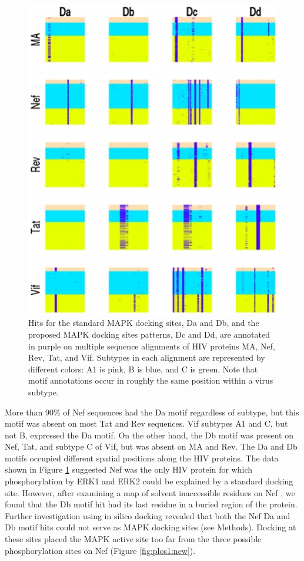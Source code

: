 \begin{figure}
\begin{center}
\includegraphics[scale=0.9]{figs/plos1_1}
\end{center}
\caption[MAPK docking site pattern hits on HIV proteins]{\small Hits
  for the standard MAPK docking sites, Da and Db, and the proposed
  MAPK docking sites patterns, Dc and Dd, are annotated in purple on
  multiple sequence alignments of HIV proteins MA, Nef, Rev, Tat, and
  Vif. Subtypes in each alignment are represented by different colors:
  A1 is pink, B is blue, and C is green. Note that motif annotations
  occur in roughly the same position within a virus
  subtype. \label{fig:plos1:fig1}}
\end{figure}

More than 90\% of Nef sequences had the Da motif regardless of
subtype, but this motif was absent on most Tat and Rev sequences. Vif
subtypes A1 and C, but not B, expressed the Da motif. On the other
hand, the Db motif was present on Nef, Tat, and subtype C of Vif, but
was absent on MA and Rev. The Da and Db motifs occupied different
spatial positions along the HIV proteins. The data shown in Figure
\ref{fig:plos1:fig1} suggested Nef was the only HIV protein for which
phosphorylation by ERK1 and ERK2 could be explained by a standard
docking site. However, after examining a map of solvent inaccessible
residues on Nef \cite{arold2001dynamic}, we found that the Db motif
hit had its last residue in a buried region of the protein. Further
investigation using in silico docking revealed that both the Nef Da
and Db motif hits could not serve as MAPK docking sites (see
Methods). Docking at these sites placed the MAPK active site too far
from the three possible phosphorylation sites on Nef (Figure
\ref{fig:plos1:new}).

